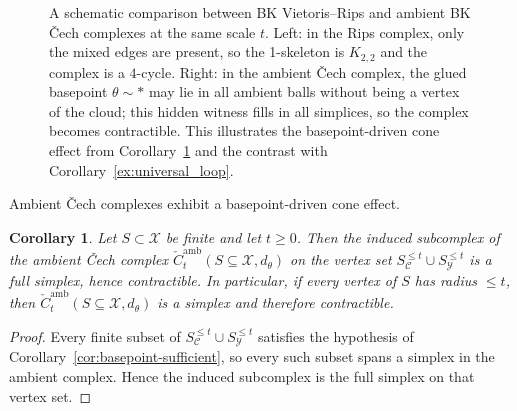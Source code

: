 \documentclass[11pt]{amsart}
\newtheorem{corollary}[theorem]{Corollary}
\theoremstyle{definition}
\theoremstyle{remark}
\newcommand{\1}{\mathbbm{1}}
\begin{document}
\begin{figure}[t]

\caption{A schematic comparison between BK Vietoris--Rips and ambient BK \v{C}ech complexes at the same scale $t$. 
Left: in the Rips complex, only the mixed edges are present, so the 1-skeleton is $K_{2,2}$ and the complex is a $4$-cycle. 
Right: in the ambient \v{C}ech complex, the glued basepoint $\theta\sim\ast$ may lie in all ambient balls without being a vertex of the cloud; this hidden witness fills in all simplices, so the complex becomes contractible. This illustrates the basepoint-driven cone effect from Corollary~\ref{cor:cech_cone_effect} and the contrast with Corollary~\ref{ex:universal_loop}.}
\label{fig:bk-rips-vs-cech}
\end{figure}

Ambient \v{C}ech complexes exhibit a basepoint-driven cone effect.
\begin{corollary}
\label{cor:cech_cone_effect}
Let $S\subset\mathcal X$ be finite and let $t\ge 0$.
Then the induced subcomplex of the ambient \v{C}ech complex $\check{C}^{\mathrm{amb}}_t(S\subseteq \mathcal X,d_\theta)$
on the vertex set $S_{\mathcal C}^{\le t}\cup S_{\mathcal Y}^{\le t}$ is a full simplex, hence contractible.
In particular, if every vertex of $S$ has radius $\le t$, then
$\check{C}^{\mathrm{amb}}_t(S\subseteq \mathcal X,d_\theta)$ is a simplex and therefore contractible.
\end{corollary}

\begin{proof}
Every finite subset of $S_{\mathcal C}^{\le t}\cup S_{\mathcal Y}^{\le t}$ satisfies the hypothesis of
Corollary~\ref{cor:basepoint-sufficient}, so every such subset spans a simplex in the ambient complex.
Hence the induced subcomplex is the full simplex on that vertex set.
\end{proof}
\end{document}
